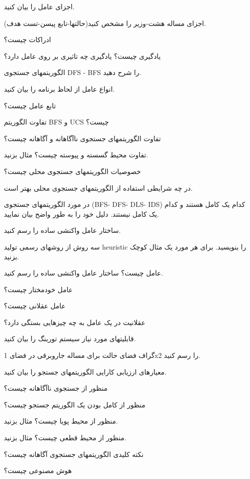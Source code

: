\documentclass[12pt]{article}
\begin{document}
\noindent
اجزای عامل را بیان کنید.

\noindent
اجزای مساله هشت-وزیر را مشخص کنید(حالتها-تابع پیسن-تست هدف).

\noindent
ادراکات چیست؟

\noindent
یادگیری چیست؟ یادگیری چه تاثیری بر روی عامل دارد؟

\noindent
الگوریتمهای جستجوی DFS - BFS را شرح دهید.

\noindent
انواع عامل از لحاظ برنامه را بیان کنید.

\noindent
تابع عامل چیست؟

\noindent
تفاوت الگوریتم BFS و UCS چیست؟

\noindent
تفاوت الگوریتمهای جستجوی ناآگاهانه و آگاهانه چیست؟

\noindent
تفاوت محیط گسسته و پیوسته چیست؟ مثال بزنید.

\noindent
خصوصیات الگوریتمهای جستجوی محلی چیست؟

\noindent
در چه شرایطی استفاده از الگوریتمهای جستجوی محلی بهتر است.

\noindent
در مورد الگوریتمهای جستجوی (BFS- DFS- DLS- IDS) کدام یک کامل هستند و کدام یک کامل نیستند. دلیل خود را به طور واضح بیان نمایید.

\noindent
ساختار عامل واکنشی ساده را رسم کنید.

\noindent
سه روش از روشهای رسمی تولید heuristic را بنویسید. برای هر مورد یک مثال کوچک بزنید.

\noindent
عامل چیست؟ ساختار عامل واکنشی ساده را رسم کنید.

\noindent
عامل خودمختار چیست؟

\noindent
عامل عقلانی چیست؟

\noindent
عقلانیت در یک عامل به چه چیزهایی بستگی دارد؟

\noindent
قابلیتهای مورد نیاز سیستم تورینگ را بیان کنید.

\noindent
گراف فضای حالت برای مساله جاروبرقی در فضای 1x2 را رسم کنید.

\noindent
معیارهای ارزیابی کارایی الگوریتمهای جستجو را بیان کنید.

\noindent
منظور از جستجوی ناآگاهانه چیست؟

\noindent
منظور از کامل بودن یک الگوریتم جستجو چیست؟

\noindent
منظور از محیط پویا چیست؟ مثال بزنید.

\noindent
منظور از محیط قطعی چیست؟ مثال بزنید.

\noindent
نکته کلیدی الگوریتمهای جستجوی آگاهانه چیست؟

\noindent
هوش مصنوعی چیست؟
\end{document}
